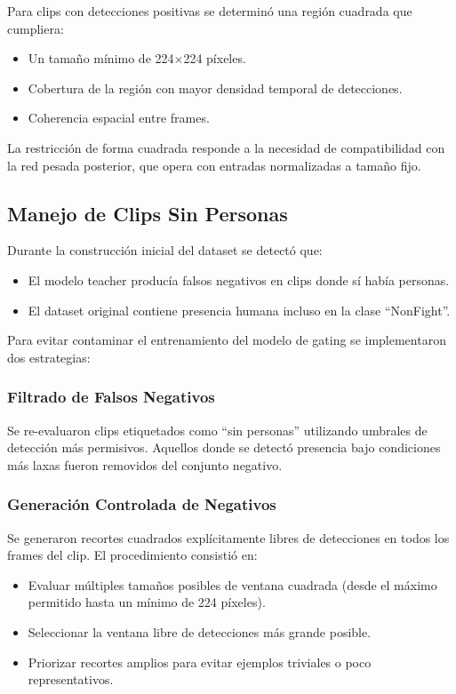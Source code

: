 \documentclass[12pt,a4paper]{article}
\begin{document}
Para clips con detecciones positivas se determinó una región cuadrada que cumpliera:

\begin{itemize}
    \item Un tamaño mínimo de 224$\times$224 píxeles.
    \item Cobertura de la región con mayor densidad temporal de detecciones.
    \item Coherencia espacial entre frames.
\end{itemize}

La restricción de forma cuadrada responde a la necesidad de compatibilidad con la red pesada posterior, que opera con entradas normalizadas a tamaño fijo.

\subsection{Manejo de Clips Sin Personas}

Durante la construcción inicial del dataset se detectó que:

\begin{itemize}
    \item El modelo teacher producía falsos negativos en clips donde sí había personas.
    \item El dataset original contiene presencia humana incluso en la clase ``NonFight''.
\end{itemize}

Para evitar contaminar el entrenamiento del modelo de gating se implementaron dos estrategias:

\subsubsection*{Filtrado de Falsos Negativos}

Se re-evaluaron clips etiquetados como ``sin personas'' utilizando umbrales de detección más permisivos. Aquellos donde se detectó presencia bajo condiciones más laxas fueron removidos del conjunto negativo.

\subsubsection*{Generación Controlada de Negativos}

Se generaron recortes cuadrados explícitamente libres de detecciones en todos los frames del clip. El procedimiento consistió en:

\begin{itemize}
    \item Evaluar múltiples tamaños posibles de ventana cuadrada (desde el máximo permitido hasta un mínimo de 224 píxeles).
    \item Seleccionar la ventana libre de detecciones más grande posible.
    \item Priorizar recortes amplios para evitar ejemplos triviales o poco representativos.
\end{itemize}
\end{document}
